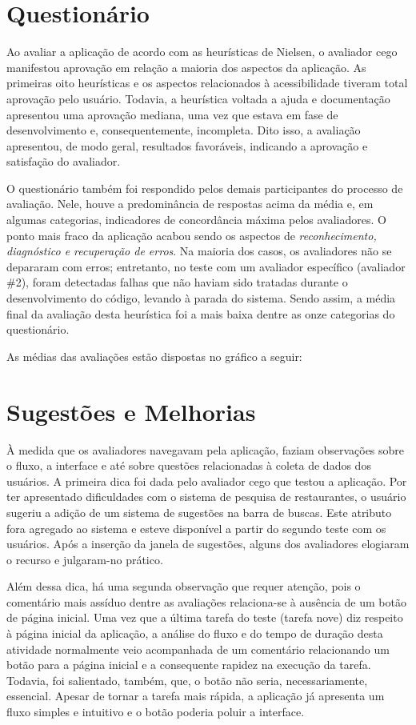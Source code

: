 \section{Questionário}

Ao avaliar a aplicação de acordo com as heurísticas de Nielsen, o avaliador cego manifestou aprovação em relação a maioria dos aspectos da aplicação.  As primeiras oito heurísticas e os aspectos relacionados à acessibilidade tiveram total aprovação pelo usuário. Todavia, a heurística voltada a ajuda e documentação apresentou uma aprovação mediana, uma vez que estava em fase de desenvolvimento e, consequentemente, incompleta. Dito isso, a avaliação apresentou, de modo geral, resultados favoráveis, indicando a aprovação e satisfação do avaliador.

O questionário também foi respondido pelos demais participantes do processo de avaliação. Nele, houve a predominância de respostas acima da média e, em algumas categorias, indicadores de concordância máxima pelos avaliadores. O ponto mais fraco da aplicação acabou sendo os aspectos de \emph{reconhecimento, diagnóstico e recuperação de erros}. Na maioria dos casos, os avaliadores não se depararam com erros; entretanto, no teste com um avaliador específico (avaliador \#2), foram detectadas falhas que não haviam sido tratadas durante o desenvolvimento do código, levando à parada do sistema. Sendo assim, a média final da avaliação desta heurística foi a mais baixa dentre as onze categorias do questionário.

As médias das avaliações estão dispostas no gráfico a seguir:

\section{Sugestões e Melhorias}

À medida que os avaliadores navegavam pela aplicação, faziam observações sobre o fluxo, a interface e até sobre questões relacionadas à coleta de dados dos usuários. A primeira dica foi dada pelo avaliador cego que testou a aplicação. Por ter apresentado dificuldades com o sistema de pesquisa de restaurantes, o usuário sugeriu a adição de um sistema de sugestões na barra de buscas. Este atributo fora agregado ao sistema e esteve disponível a partir do segundo teste com os usuários. Após a inserção da janela de sugestões, alguns dos avaliadores elogiaram o recurso e julgaram-no prático.

Além dessa dica, há uma segunda observação que requer atenção, pois o comentário mais assíduo dentre as avaliações relaciona-se à ausência de um botão de página inicial. Uma vez que a última tarefa do teste (tarefa nove) diz respeito à página inicial da aplicação, a análise do fluxo e do tempo de duração desta atividade normalmente veio acompanhada de um comentário relacionando um botão para a página inicial e a consequente rapidez na execução da tarefa. Todavia, foi salientado, também, que, o botão não seria, necessariamente, essencial. Apesar de tornar a tarefa mais rápida, a aplicação já apresenta um fluxo simples e intuitivo e o botão poderia poluir a interface.

